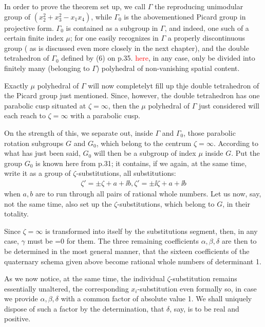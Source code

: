 In order to prove the theorem set up, we call $\Gamma$ the reproducing unimodular group of $(x_2^2+x_3^2-x_1x_4)$, while $\Gamma_0$ is the abovementioned Picard group in projective form. $\Gamma_0$ is contained as a subgroup in $\Gamma$, and indeed, one such of a certain finite index $\mu$; for one easily recognizes in $\Gamma$ a properly discontinuous group ( as is discussed even more closely in the next chapter), and the double tetrahedron of  $\Gamma_0$ defined by (6) on p.35. \textcolor{red}{here}, in any case, only be divided into finitely many (belonging to  $\Gamma$) polyhedral of non-vanishing spatial content.

Exactly $\mu$ polyhedral of  $\Gamma$ will now completelyt fill up thje double tetrahedron of the Picard group just mentioned. Since, however, the double tetrahedron has one parabolic cusp situated at $\zeta=\infty$, then the $\mu$ polyhedral of  $\Gamma$ just considered will each reach to $\zeta=\infty$ with a parabolic cusp.

On the strength of this, we separate out, inside $\Gamma$ and $\Gamma_0$, those parabolic rotation subgroups $G$ and $G_0$, which belong to the centrum $\zeta=\infty$. According to what has just been said, $G_0$ will then be a subgroup of index $\mu$ inside $G$. Put the group $G_0$ is known here from p.31; it contains, if we again, at the same time, write it as a group of $\zeta$-substitutions, all substitutions:
\begin{align}
    \zeta'=\pm\zeta+a+\ii b,\zeta'=\pm\ii\zeta+a+\ii b
\end{align}
when $a,b$ are to run through all pairs of rational whole numbers. Let us now, say, not the same time, also set up the $\zeta$-substitutions, which belong to $G$, in their totality.

Since $\zeta=\infty$ is transformed into itself by the substitutions segment, then, in any case, $\gamma$ must be =0 for them. The three remaining coefficients $\alpha,\beta,\delta$ are then to be determined in the most general manner, that the sixteen coefficients of the quaternary schema given above become rational whole numbers of determinant 1.

As we now notice, at the same time, the individual $\zeta$-substitution remains essentially unaltered, the corresponding $x_i$-substitution even formally so, in case we provide $\alpha,\beta,\delta$ with a common factor of absolute value 1. We shall uniquely dispose of such a factor by the determination, that $\delta$, say, is to be real and positive.

